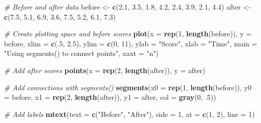 \documentclass[]{book}
\newenvironment{Shaded}{\begin{snugshade}}{\end{snugshade}}
\newcommand{\KeywordTok}[1]{\textcolor[rgb]{0.13,0.29,0.53}{\textbf{{#1}}}}
\newcommand{\DataTypeTok}[1]{\textcolor[rgb]{0.13,0.29,0.53}{{#1}}}
\newcommand{\DecValTok}[1]{\textcolor[rgb]{0.00,0.00,0.81}{{#1}}}
\newcommand{\FloatTok}[1]{\textcolor[rgb]{0.00,0.00,0.81}{{#1}}}
\newcommand{\StringTok}[1]{\textcolor[rgb]{0.31,0.60,0.02}{{#1}}}
\newcommand{\CommentTok}[1]{\textcolor[rgb]{0.56,0.35,0.01}{\textit{{#1}}}}
\newcommand{\NormalTok}[1]{{#1}}
\theoremstyle{definition}
\theoremstyle{definition}
\theoremstyle{remark}
\begin{document}
\begin{Shaded}
\begin{Highlighting}[]
\CommentTok{# Before and after data}
\NormalTok{before <-}\StringTok{ }\KeywordTok{c}\NormalTok{(}\FloatTok{2.1}\NormalTok{, }\FloatTok{3.5}\NormalTok{, }\FloatTok{1.8}\NormalTok{, }\FloatTok{4.2}\NormalTok{, }\FloatTok{2.4}\NormalTok{, }\FloatTok{3.9}\NormalTok{, }\FloatTok{2.1}\NormalTok{, }\FloatTok{4.4}\NormalTok{)}
\NormalTok{after <-}\StringTok{ }\KeywordTok{c}\NormalTok{(}\FloatTok{7.5}\NormalTok{, }\FloatTok{5.1}\NormalTok{, }\FloatTok{6.9}\NormalTok{, }\FloatTok{3.6}\NormalTok{, }\FloatTok{7.5}\NormalTok{, }\FloatTok{5.2}\NormalTok{, }\FloatTok{6.1}\NormalTok{, }\FloatTok{7.3}\NormalTok{)}

\CommentTok{# Create plotting space and before scores}
\KeywordTok{plot}\NormalTok{(}\DataTypeTok{x =} \KeywordTok{rep}\NormalTok{(}\DecValTok{1}\NormalTok{, }\KeywordTok{length}\NormalTok{(before)), }
     \DataTypeTok{y =} \NormalTok{before, }
     \DataTypeTok{xlim =} \KeywordTok{c}\NormalTok{(.}\DecValTok{5}\NormalTok{, }\FloatTok{2.5}\NormalTok{), }
     \DataTypeTok{ylim =} \KeywordTok{c}\NormalTok{(}\DecValTok{0}\NormalTok{, }\DecValTok{11}\NormalTok{),}
     \DataTypeTok{ylab =} \StringTok{"Score"}\NormalTok{, }
     \DataTypeTok{xlab =} \StringTok{"Time"}\NormalTok{,}
     \DataTypeTok{main =} \StringTok{"Using segments() to connect points"}\NormalTok{, }
     \DataTypeTok{xaxt =} \StringTok{"n"}\NormalTok{)}

\CommentTok{# Add after scores}
\KeywordTok{points}\NormalTok{(}\DataTypeTok{x =} \KeywordTok{rep}\NormalTok{(}\DecValTok{2}\NormalTok{, }\KeywordTok{length}\NormalTok{(after)), }\DataTypeTok{y =} \NormalTok{after)}

\CommentTok{# Add connections with segments()}
\KeywordTok{segments}\NormalTok{(}\DataTypeTok{x0 =} \KeywordTok{rep}\NormalTok{(}\DecValTok{1}\NormalTok{, }\KeywordTok{length}\NormalTok{(before)), }
         \DataTypeTok{y0 =} \NormalTok{before, }
         \DataTypeTok{x1 =} \KeywordTok{rep}\NormalTok{(}\DecValTok{2}\NormalTok{, }\KeywordTok{length}\NormalTok{(after)), }
         \DataTypeTok{y1 =} \NormalTok{after, }
         \DataTypeTok{col =} \KeywordTok{gray}\NormalTok{(}\DecValTok{0}\NormalTok{, .}\DecValTok{5}\NormalTok{))}

\CommentTok{# Add labels}
\KeywordTok{mtext}\NormalTok{(}\DataTypeTok{text =} \KeywordTok{c}\NormalTok{(}\StringTok{"Before"}\NormalTok{, }\StringTok{"After"}\NormalTok{), }
      \DataTypeTok{side =} \DecValTok{1}\NormalTok{, }\DataTypeTok{at =} \KeywordTok{c}\NormalTok{(}\DecValTok{1}\NormalTok{, }\DecValTok{2}\NormalTok{), }\DataTypeTok{line =} \DecValTok{1}\NormalTok{)}
\end{Highlighting}
\end{Shaded}
\end{document}

